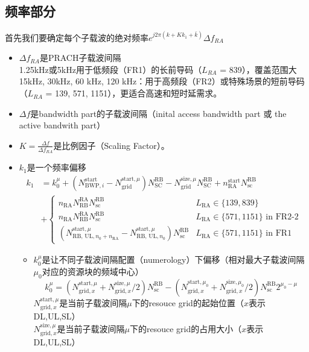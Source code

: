 \documentclass{article}
\begin{document}
\subsection{频率部分}
首先我们要确定每个子载波的绝对频率$e^{j2\pi(k+Kk_1+\bar{k})}\Delta f_{RA}$
	\begin{itemize}
	\item $\Delta f_{RA}$是PRACH子载波间隔\\
	1.25kHz或5kHz用于低频段（FR1）的长前导码（$L_{RA}$ = 839），覆盖范围大\\
	15kHz, 30kHz, 60 kHz, 120 kHz：用于高频段（FR2）或特殊场景的短前导码（$L_{RA}$ = 139, 571, 1151），更适合高速和短时延需求。
	\item $\Delta f$是bandwidth part的子载波间隔（inital access bandwidth part 或 the active bandwith part）
	\item $K=\frac{\Delta f}{\Delta f_{RA}}$是比例因子（Scaling Factor）。
	\item $k_1$是一个频率偏移
	\begin{align*}
	k_1 &= k^{\mu}_0 + (N^{\text{start}}_{\text{BWP}, i} - N^{\text{start}, \mu}_{\text{grid}})N^{\text{RB}}_{\text{SC}} - N^{\text{size}, \mu}_{\text{grid}}N^{\text{RB}}_{\text{SC}} + n^{\text{start}}_{\text{RA}}N^{\text{RB}}_{\text{sc}} \\
	&+\begin{cases}
	n_{\text{RA}}N^{\text{RA}}_{\text{RB}}N^{\text{RB}}_{\text{sc}} & L_{\text{RA}}\in\{139, 839\} \\
	n_{\text{RA}}N^{\text{RA}}_{\text{RB}}N^{\text{RB}}_{\text{sc}} & L_{\text{RA}}\in\{571, 1151\} \text{ in FR2-2} \\
	(N^{\text{start}, \mu}_{\text{RB, UL}, n_0+n_{\text{RA}}} - N^{\text{start}, \mu}_{\text{RB, UL}, n_0} ) N^{\text{RB}}_{\text{sc}} & L_{\text{RA}}\in\{571, 1151\} \text{ in FR1}
	\end{cases}
	\end{align*}
		\begin{itemize}
		\item $k^{\mu}_0$是让不同子载波间隔配置（numerology）下偏移（相对最大子载波间隔$\mu_0$对应的资源块的频域中心）
		\[
		k^{\mu}_0 = (N^{\text{start},\mu}_{\text{grid},x} + N^{\text{size},\mu}_{\text{grid},x}/2)N_{\text{sc}}^{\text{RB}} - (N^{\text{start},\mu_0}_{\text{grid},x} + N^{\text{size},\mu_0}_{\text{grid},x}/2)N_{\text{sc}}^{\text{RB}}2^{\mu_0 - \mu}
		\]
		$N^{\text{start},\mu}_{\text{grid},x}$是当前子载波间隔$\mu$下的resouce grid的起始位置（$x$表示DL,UL,SL）\\
		$N^{\text{size},\mu}_{\text{grid},x}$是当前子载波间隔$\mu$下的resouce grid的占用大小（$x$表示DL,UL,SL）\\

\end{itemize}
\end{itemize}
\end{document}
